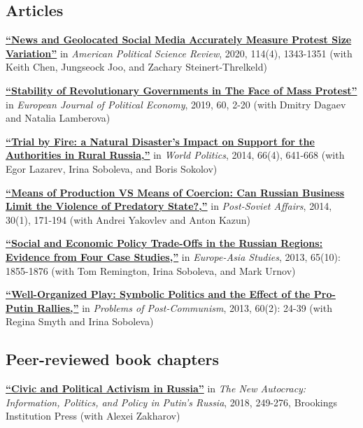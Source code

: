 \documentclass[11pt,]{article}
\begin{document}
\hypertarget{articles}{%
\subsection{Articles}\label{articles}}

\href{https://doi.org/10.1017/S0003055420000295}{\textbf{``News and
Geolocated Social Media Accurately Measure Protest Size Variation''}} in
\emph{American Political Science Review}, 2020, 114(4), 1343-1351 (with
Keith Chen, Jungseock Joo, and Zachary Steinert-Threlkeld)

\href{https://doi.org/10.1016/j.ejpoleco.2019.08.003}{\textbf{``Stability
of Revolutionary Governments in The Face of Mass Protest''}} in
\emph{European Journal of Political Economy}, 2019, 60, 2-20 (with
Dmitry Dagaev and Natalia Lamberova)

\href{http://dx.doi.org/10.1017/S0043887114000215}{\textbf{``Trial by
Fire: a Natural Disaster's Impact on Support for the Authorities in
Rural Russia,''}} in \emph{World Politics}, 2014, 66(4), 641-668 (with
Egor Lazarev, Irina Soboleva, and Boris Sokolov)

\href{http://www.tandfonline.com/doi/full/10.1080/1060586X.2013.859434}{\textbf{``Means
of Production VS Means of Coercion: Can Russian Business Limit the
Violence of Predatory State?,''}} in \emph{Post-Soviet Affairs}, 2014,
30(1), 171-194 (with Andrei Yakovlev and Anton Kazun)

\href{http://www.tandfonline.com/doi/full/10.1080/09668136.2013.838055}{\textbf{``Social
and Economic Policy Trade-Offs in the Russian Regions: Evidence from
Four Case Studies,''}} in \emph{Europe-Asia Studies}, 2013, 65(10):
1855-1876 (with Tom Remington, Irina Soboleva, and Mark Urnov)

\href{“Well-Organized\%20Play:\%20Symbolic\%20Politics\%20and\%20the\%20Effect\%20of\%20the\%20Pro-Putin\%20Rallies,”}{\textbf{``Well-Organized
Play: Symbolic Politics and the Effect of the Pro-Putin Rallies,''}} in
\emph{Problems of Post-Communism}, 2013, 60(2): 24-39 (with Regina Smyth
and Irina Soboleva)

\hypertarget{peer-reviewed-book-chapters}{%
\subsection{Peer-reviewed book
chapters}\label{peer-reviewed-book-chapters}}

\href{http://www.jstor.org/stable/10.7864/j.ctt1zkjzsh.13}{\textbf{``Civic
and Political Activism in Russia''}} in \emph{The New Autocracy:
Information, Politics, and Policy in Putin's Russia}, 2018, 249-276,
Brookings Institution Press (with Alexei Zakharov)
\end{document}
